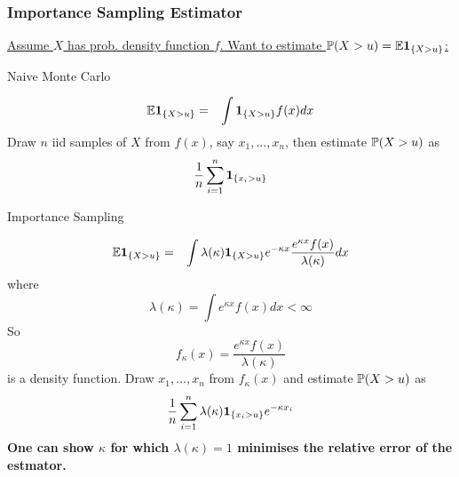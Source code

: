 \documentclass{beamer}
\begin{document}
\begin{frame}
  \frametitle{Importance Sampling Estimator}
  \underline{\scriptsize{Assume $X$ has prob. density function $f$. Want to estimate $\P(X
  > u) = \E \1{X > u}$:}}

  \begin{minipage}[t]{0.45\linewidth}
    \textcolor[HTML]{990033}{Naive Monte Carlo}
    \begin{scriptsize}
      \begin{eqnarray*}
        \E \1{X > u} &=& \int \1{X > u} f(x) dx
      \end{eqnarray*}
      Draw $n$ iid samples of $X$ from $f(x)$, say $x_1, ..., x_n$,
      then estimate $\P(X > u)$ as
      \[
      {1 \over n} \sum_{i=1}^n \1{x_i > u}
      \]
    \end{scriptsize}
  \end{minipage}\hfill
  \begin{minipage}[t]{0.5\linewidth}
    \textcolor[HTML]{990033}{Importance Sampling}
    \begin{scriptsize}
      \begin{eqnarray*}
        \E \1{X > u} &=& \int \lambda(\kappa)\1{X > u} e^{-\kappa x}
                         {e^{\kappa x} f(x) \over \lambda(\kappa)} dx
      \end{eqnarray*}
      where
      \[
      \lambda(\kappa) = \int e^{\kappa x} f(x) dx < \infty
      \]
      So
      \[
      f_\kappa(x) = \frac{e^{\kappa x} f(x)}{\lambda(\kappa)}
      \]
      is a density function. Draw $x_1, ..., x_n$ from
      $f_\kappa(x)$ and estimate $\P(X > u)$ as
      \[
      {1\over n}\sum_{i=1}^n \lambda(\kappa) \1{x_i > u} e^{-\kappa x_i}
      \]
      \bf{One can show $\kappa$ for which
        $\lambda(\kappa) = 1$ minimises the relative error of the
        estmator.}
    \end{scriptsize}
  \end{minipage}
\end{frame}
\end{document}
